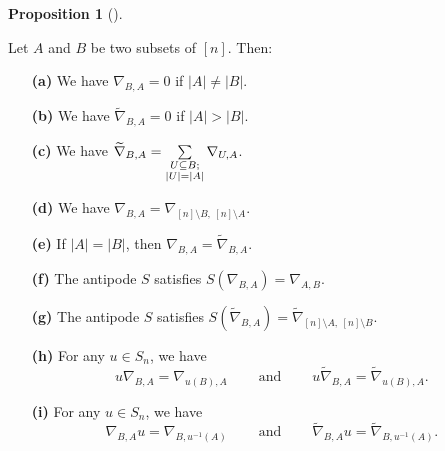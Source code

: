 \documentclass[numbers=enddot,12pt,final,onecolumn,notitlepage]{scrartcl}%
\numberwithin{exer}{subsection}
\theoremstyle{definition}
\newtheorem{prop}[theo]{Proposition}
\newenvironment{proposition}[1][]
{\begin{prop}[#1]\begin{leftbar}}
{\end{leftbar}\end{prop}}
\let\sumnonlimits\sum
\renewcommand{\sum}{\sumnonlimits\limits}
\begin{document}
\begin{proposition}
\label{prop.Nabla.simple}Let $A$ and $B$ be two subsets of $\left[  n\right]
$. Then:

\begin{enumerate}
\item[\textbf{(a)}] We have $\nabla_{B,A}=0$ if $\left\vert A\right\vert
\neq\left\vert B\right\vert $.

\item[\textbf{(b)}] We have $\widetilde{\nabla}_{B,A}=0$ if $\left\vert
A\right\vert >\left\vert B\right\vert $.

\item[\textbf{(c)}] We have $\widetilde{\nabla}_{B,A}=\sum
\limits_{\substack{U\subseteq B;\\\left\vert U\right\vert =\left\vert
A\right\vert }}\nabla_{U,A}$.

\item[\textbf{(d)}] We have $\nabla_{B,A}=\nabla_{\left[  n\right]  \setminus
B,\ \left[  n\right]  \setminus A}$.

\item[\textbf{(e)}] If $\left\vert A\right\vert =\left\vert B\right\vert $,
then $\nabla_{B,A}=\widetilde{\nabla}_{B,A}$.

\item[\textbf{(f)}] The antipode $S$ satisfies $S\left(  \nabla_{B,A}\right)
=\nabla_{A,B}$.

\item[\textbf{(g)}] The antipode $S$ satisfies $S\left(  \widetilde{\nabla
}_{B,A}\right)  =\widetilde{\nabla}_{\left[  n\right]  \setminus A,\ \left[
n\right]  \setminus B}$.

\item[\textbf{(h)}] For any $u\in S_{n}$, we have
\[
u\nabla_{B,A}=\nabla_{u\left(  B\right)  ,A}\ \ \ \ \ \ \ \ \ \ \text{and}%
\ \ \ \ \ \ \ \ \ \ u\widetilde{\nabla}_{B,A}=\widetilde{\nabla}_{u\left(
B\right)  ,A}.
\]


\item[\textbf{(i)}] For any $u\in S_{n}$, we have
\[
\nabla_{B,A}u=\nabla_{B,u^{-1}\left(  A\right)  }%
\ \ \ \ \ \ \ \ \ \ \text{and}\ \ \ \ \ \ \ \ \ \ \widetilde{\nabla}%
_{B,A}u=\widetilde{\nabla}_{B,u^{-1}\left(  A\right)  }.
\]

\end{enumerate}
\end{proposition}
\end{document}
